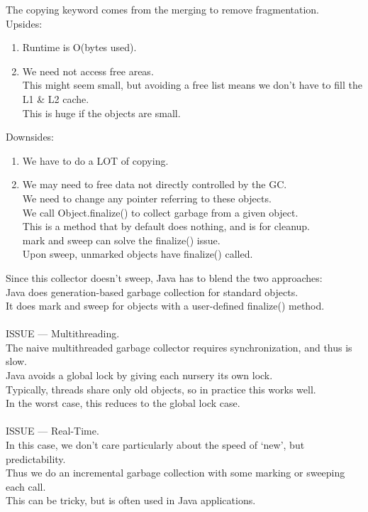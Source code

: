 \documentclass[../../lecture_notes.tex]{subfiles}
\begin{document}
\begin{enumerate} [itemsep=0mm]
		The copying keyword comes from the merging to remove fragmentation.\\
		Upsides:
			\begin{enumerate} [itemsep=0mm]
				\item Runtime is O(bytes used).
				\item We need not access free areas.\\
					This might seem small, but avoiding a free list means 
						we don’t have to fill the L1 \& L2 cache.\\
					This is huge if the objects are small.
			\end{enumerate}
		Downsides:
			\begin{enumerate} [itemsep=0mm]
				\item We have to do a LOT of copying.
				\item We may need to free data not directly controlled by the GC.\\
				        We need to change any pointer referring to these objects.\\
				        We call Object.finalize() to collect garbage from a given object.\\
					This is a method that by default does nothing, and is for cleanup.\\
					mark and sweep can solve the finalize() issue.\\
					Upon sweep, unmarked objects have finalize() called.\\
				\end{enumerate} 
		Since this collector doesn’t sweep, Java has to blend the two approaches:\\
		Java does generation-based garbage collection for standard objects.\\
		It does mark and sweep for objects with a user-defined finalize() method.\\
\\
		ISSUE — Multithreading.\\
		The naive multithreaded garbage collector requires synchronization, and thus is slow.\\
		Java avoids a global lock by giving each nursery its own lock.\\
		Typically, threads share only old objects, so in practice this works well.\\
		In the worst case, this reduces to the global lock case.\\
\\
		ISSUE — Real-Time.\\
		In this case, we don’t care particularly about the speed of ‘new’, but predictability.\\
		Thus we do an incremental garbage collection with some marking or sweeping each call.\\
		This can be tricky, but is often used in Java applications.\\



\end{enumerate}
\end{document}
